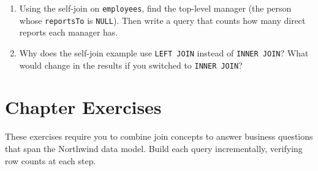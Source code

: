 \documentclass[
  letterpaper,
  DIV=11,
  numbers=noendperiod]{scrreprt}
\begin{document}
\begin{tcolorbox}[enhanced jigsaw, opacitybacktitle=0.6, arc=.35mm, colback=white, bottomtitle=1mm, opacityback=0, toprule=.15mm, left=2mm, colbacktitle=quarto-callout-note-color!10!white, breakable, coltitle=black, toptitle=1mm, colframe=quarto-callout-note-color-frame, bottomrule=.15mm, titlerule=0mm, title=\textcolor{quarto-callout-note-color}{\faInfo}\hspace{0.5em}{Exercises}, rightrule=.15mm, leftrule=.75mm]

\begin{enumerate}
\def\labelenumi{\arabic{enumi}.}
\item
  Using the self-join on \texttt{employees}, find the top-level manager
  (the person whose \texttt{reportsTo} is \texttt{NULL}). Then write a
  query that counts how many direct reports each manager has.
\item
  Why does the self-join example use \texttt{LEFT\ JOIN} instead of
  \texttt{INNER\ JOIN}? What would change in the results if you switched
  to \texttt{INNER\ JOIN}?
\end{enumerate}

\end{tcolorbox}

\section{Chapter Exercises}\label{chapter-exercises-2}

These exercises require you to combine join concepts to answer business
questions that span the Northwind data model. Build each query
incrementally, verifying row counts at each step.
\end{document}
